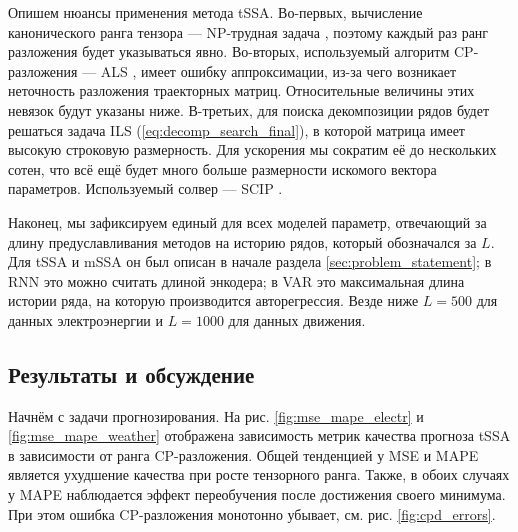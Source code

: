 			Опишем нюансы применения метода tSSA. Во-первых, вычисление канонического ранга тензора --- NP-трудная задача \cite{HASTAD1990644}, поэтому каждый раз ранг разложения будет указываться явно. Во-вторых, используемый алгоритм CP-разложения --- ALS \cite{kolda_tensors}, имеет ошибку аппроксимации, из-за чего возникает неточность разложения траекторных матриц. Относительные величины этих невязок будут указаны ниже. В-третьих, для поиска декомпозиции рядов будет решаться задача ILS (\ref{eq:decomp_search_final}), в которой матрица имеет высокую строковую размерность. Для ускорения мы сократим её до нескольких сотен, что всё ещё будет много больше размерности искомого вектора параметров. Используемый солвер --- SCIP \cite{BolusaniEtal2024ZR}.
			
			Наконец, мы зафиксируем единый для всех моделей параметр, отвечающий за длину предуславливания методов на историю рядов, который обозначался за $ L $. Для tSSA и mSSA он был описан в начале раздела \ref{sec:problem_statement}; в RNN это можно считать длиной энкодера; в VAR это максимальная длина истории ряда, на которую производится авторегрессия. Везде ниже $ L = 500 $ для данных электроэнергии и $ L = 1000 $ для данных движения.		
				
		\subsection{Результаты и обсуждение}
			
			Начнём с задачи прогнозирования. На рис. \ref{fig:mse_mape_electr} и \ref{fig:mse_mape_weather} отображена зависимость метрик качества прогноза tSSA в зависимости от ранга CP-разложения. Общей тенденцией у MSE и MAPE является ухудшение качества при росте тензорного ранга. Также, в обоих случаях у MAPE наблюдается эффект переобучения после достижения своего минимума. При этом ошибка CP-разложения монотонно убывает, см. рис. \ref{fig:cpd_errors}.
			
